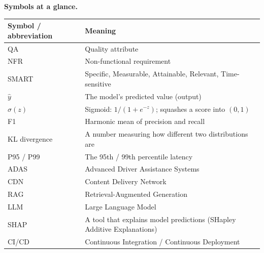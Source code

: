 \documentclass[a4paper,11pt]{article}
\begin{document}
\medskip
\noindent\textbf{Symbols at a glance.}
\begin{center}\small
\begin{tabular}{@{}ll@{}}
\toprule
\textbf{Symbol / abbreviation} & \textbf{Meaning} \\
\midrule
QA & Quality attribute \\
NFR & Non-functional requirement \\
SMART & Specific, Measurable, Attainable, Relevant, Time-sensitive \\
$\hat{y}$ & The model's predicted value (output) \\
$\sigma(z)$ & Sigmoid: $1/(1+e^{-z})$; squashes a score into $(0,1)$ \\
F1 & Harmonic mean of precision and recall \\
KL divergence & A number measuring how different two distributions are \\
P95 / P99 & The 95th / 99th percentile latency \\
ADAS & Advanced Driver Assistance Systems \\
CDN & Content Delivery Network \\
RAG & Retrieval-Augmented Generation \\
LLM & Large Language Model \\
SHAP & A tool that explains model predictions (SHapley Additive Explanations) \\
CI/CD & Continuous Integration / Continuous Deployment \\
\bottomrule
\end{tabular}
\end{center}
\end{document}
